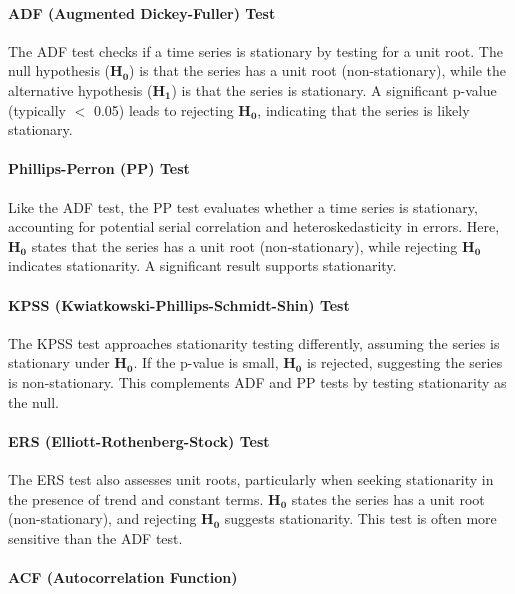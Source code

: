 \documentclass[11pt]{article}
\begin{document}
\paragraph{ADF (Augmented Dickey-Fuller) Test}

The ADF test checks if a time series is stationary by testing for a unit root. The null hypothesis ($\mathbf{H}_{\mathbf{0}}$) is that the series has a unit root (non-stationary), while the alternative hypothesis ($\mathbf{H}_{\mathbf{1}}$) is that the series is stationary. A significant p-value (typically $<$ 0.05) leads to rejecting $\mathbf{H}_{\mathbf{0}}$, indicating that the series is likely stationary.

\paragraph{Phillips-Perron (PP) Test}

Like the ADF test, the PP test evaluates whether a time series is stationary, accounting for potential serial correlation and heteroskedasticity in errors. Here, $\mathbf{H}_{\mathbf{0}}$ states that the series has a unit root (non-stationary), while rejecting $\mathbf{H}_{\mathbf{0}}$ indicates stationarity. A significant result supports stationarity.

\paragraph{KPSS (Kwiatkowski-Phillips-Schmidt-Shin) Test}

The KPSS test approaches stationarity testing differently, assuming the series is stationary under $\mathbf{H}_{\mathbf{0}}$. If the p-value is small, $\mathbf{H}_{\mathbf{0}}$ is rejected, suggesting the series is non-stationary. This complements ADF and PP tests by testing stationarity as the null.

\paragraph{ERS (Elliott-Rothenberg-Stock) Test}

The ERS test also assesses unit roots, particularly when seeking stationarity in the presence of trend and constant terms. $\mathbf{H}_{\mathbf{0}}$ states the series has a unit root (non-stationary), and rejecting $\mathbf{H}_{\mathbf{0}}$ suggests stationarity. This test is often more sensitive than the ADF test.

\paragraph{ACF (Autocorrelation Function)}
\end{document}
